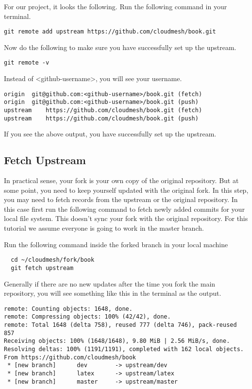 For our project, it looks the following.
Run the following command in your terminal.

\begin{lstlisting}
git remote add upstream https://github.com/cloudmesh/book.git
\end{lstlisting}

Now do the following to make sure you have successfully set up the upstream.

\begin{lstlisting}
git remote -v  
\end{lstlisting}

\begin{NOTE}
 Instead of <github-username>, you will see your username. 
\end{NOTE}

\begin{lstlisting}
origin	git@github.com:<github-username>/book.git (fetch)
origin	git@github.com:<github-username>/book.git (push)
upstream	https://github.com/cloudmesh/book.git (fetch)
upstream	https://github.com/cloudmesh/book.git (push)
\end{lstlisting}

If you see the above output, you have successfully set up the upstream.

\subsection{Fetch Upstream}

In practical sense, your fork is your own copy of the original
repository.  But at some point, you need to keep yourself updated with
the original fork.  In this step, you may need to fetch records from
the upstream or the original repository. In this case first run the
following command to fetch newly added commits for your local file
system. This doesn't sync your fork with the original repository. For this
tutorial we assume everyone is going to work in the master branch.

Run the following command inside the forked branch in your local machine

\begin{lstlisting}
  cd ~/cloudmesh/fork/book
  git fetch upstream
\end{lstlisting}

Generally if there are no new updates after the time you fork the main
repository, you will see something like this in the terminal as the
output.

\begin{lstlisting}
remote: Counting objects: 1648, done.
remote: Compressing objects: 100% (42/42), done.
remote: Total 1648 (delta 758), reused 777 (delta 746), pack-reused 857
Receiving objects: 100% (1648/1648), 9.80 MiB | 2.56 MiB/s, done.
Resolving deltas: 100% (1191/1191), completed with 162 local objects.
From https://github.com/cloudmesh/book
 * [new branch]      dev        -> upstream/dev
 * [new branch]      latex      -> upstream/latex
 * [new branch]      master     -> upstream/master
\end{lstlisting}

